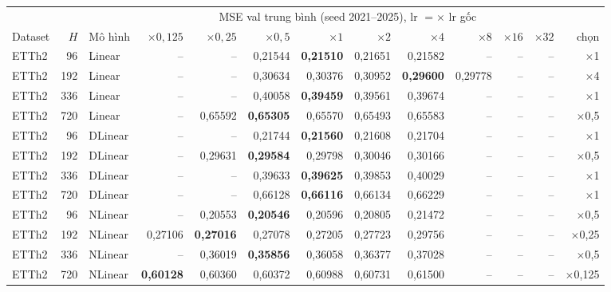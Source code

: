 {\scriptsize
\setlength{\tabcolsep}{3.5pt}
\begin{longtable}{@{}lrl rrrrrrrrr r@{}}
\toprule
 & & & \multicolumn{9}{c}{MSE val trung bình (seed 2021--2025), lr $= \times$ lr gốc} & \\
\cmidrule(lr){4-12}
Dataset & $H$ & Mô hình & $\times 0{,}125$ & $\times 0{,}25$ & $\times 0{,}5$ & $\times 1$ & $\times 2$ & $\times 4$ & $\times 8$ & $\times 16$ & $\times 32$ & chọn \\
\midrule
\endhead
ETTh2 & 96 & Linear & -- & -- & 0{,}21544 & \textbf{0{,}21510} & 0{,}21651 & 0{,}21582 & -- & -- & -- & $\times$1 \\
ETTh2 & 192 & Linear & -- & -- & 0{,}30634 & 0{,}30376 & 0{,}30952 & \textbf{0{,}29600} & 0{,}29778 & -- & -- & $\times$4 \\
ETTh2 & 336 & Linear & -- & -- & 0{,}40058 & \textbf{0{,}39459} & 0{,}39561 & 0{,}39674 & -- & -- & -- & $\times$1 \\
ETTh2 & 720 & Linear & -- & 0{,}65592 & \textbf{0{,}65305} & 0{,}65570 & 0{,}65493 & 0{,}65583 & -- & -- & -- & $\times$0{,}5 \\
\addlinespace[2pt]
ETTh2 & 96 & DLinear & -- & -- & 0{,}21744 & \textbf{0{,}21560} & 0{,}21608 & 0{,}21704 & -- & -- & -- & $\times$1 \\
ETTh2 & 192 & DLinear & -- & 0{,}29631 & \textbf{0{,}29584} & 0{,}29798 & 0{,}30046 & 0{,}30166 & -- & -- & -- & $\times$0{,}5 \\
ETTh2 & 336 & DLinear & -- & -- & 0{,}39633 & \textbf{0{,}39625} & 0{,}39853 & 0{,}40029 & -- & -- & -- & $\times$1 \\
ETTh2 & 720 & DLinear & -- & -- & 0{,}66128 & \textbf{0{,}66116} & 0{,}66134 & 0{,}66229 & -- & -- & -- & $\times$1 \\
\addlinespace[2pt]
ETTh2 & 96 & NLinear & -- & 0{,}20553 & \textbf{0{,}20546} & 0{,}20596 & 0{,}20805 & 0{,}21472 & -- & -- & -- & $\times$0{,}5 \\
ETTh2 & 192 & NLinear & 0{,}27106 & \textbf{0{,}27016} & 0{,}27078 & 0{,}27205 & 0{,}27723 & 0{,}29756 & -- & -- & -- & $\times$0{,}25 \\
ETTh2 & 336 & NLinear & -- & 0{,}36019 & \textbf{0{,}35856} & 0{,}36058 & 0{,}36377 & 0{,}37028 & -- & -- & -- & $\times$0{,}5 \\
ETTh2 & 720 & NLinear & \textbf{0{,}60128} & 0{,}60360 & 0{,}60372 & 0{,}60988 & 0{,}60731 & 0{,}61500 & -- & -- & -- & $\times$0{,}125 \\

\end{longtable}}

